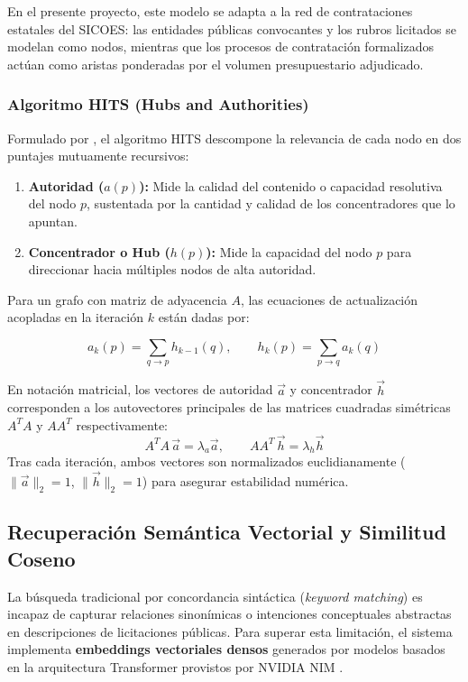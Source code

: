 En el presente proyecto, este modelo se adapta a la red de contrataciones estatales del SICOES: las entidades públicas convocantes y los rubros licitados se modelan como nodos, mientras que los procesos de contratación formalizados actúan como aristas ponderadas por el volumen presupuestario adjudicado.

\subsubsection{Algoritmo HITS (Hubs and Authorities)}
Formulado por \citet{kleinberg1999authoritative}, el algoritmo HITS descompone la relevancia de cada nodo en dos puntajes mutuamente recursivos:
\begin{enumerate}[leftmargin=*]
    \item \textbf{Autoridad ($a(p)$):} Mide la calidad del contenido o capacidad resolutiva del nodo $p$, sustentada por la cantidad y calidad de los concentradores que lo apuntan.
    \item \textbf{Concentrador o Hub ($h(p)$):} Mide la capacidad del nodo $p$ para direccionar hacia múltiples nodos de alta autoridad.
\end{enumerate}

Para un grafo con matriz de adyacencia $A$, las ecuaciones de actualización acopladas en la iteración $k$ están dadas por:

\begin{equation}
    a_k(p) = \sum_{q \to p} h_{k-1}(q), \qquad h_k(p) = \sum_{p \to q} a_k(q)
    \label{eq:hits}
\end{equation}

En notación matricial, los vectores de autoridad $\vec{a}$ y concentrador $\vec{h}$ corresponden a los autovectores principales de las matrices cuadradas simétricas $A^T A$ y $A A^T$ respectivamente:
\begin{equation}
    A^T A \, \vec{a} = \lambda_a \vec{a}, \qquad A A^T \, \vec{h} = \lambda_h \vec{h}
\end{equation}
Tras cada iteración, ambos vectores son normalizados euclidianamente ($\|\vec{a}\|_2 = 1$, $\|\vec{h}\|_2 = 1$) para asegurar estabilidad numérica.

\subsection{Recuperación Semántica Vectorial y Similitud Coseno}
La búsqueda tradicional por concordancia sintáctica (\textit{keyword matching}) es incapaz de capturar relaciones sinonímicas o intenciones conceptuales abstractas en descripciones de licitaciones públicas. Para superar esta limitación, el sistema implementa \textbf{embeddings vectoriales densos} generados por modelos basados en la arquitectura Transformer provistos por NVIDIA NIM \citep{nvidia2024nim}.

